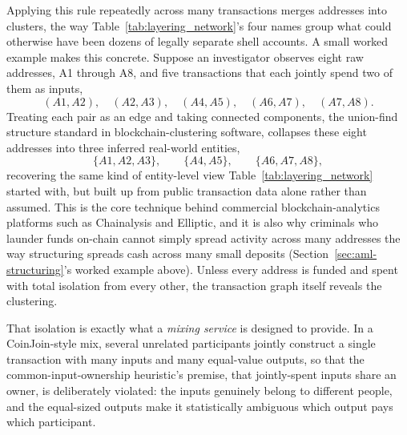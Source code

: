 \documentclass[../ai_in_finance]{subfiles}
\begin{document}
Applying this rule repeatedly across many transactions merges addresses into clusters, the way Table~\ref{tab:layering_network}'s four names group what could otherwise have been dozens of legally separate shell accounts. A small worked example makes this concrete. Suppose an investigator observes eight raw addresses, A1 through A8, and five transactions that each jointly spend two of them as inputs,
\begin{equation*}
(A1, A2), \quad (A2, A3), \quad (A4, A5), \quad (A6, A7), \quad (A7, A8).
\end{equation*}
Treating each pair as an edge and taking connected components, the union-find structure standard in blockchain-clustering software, collapses these eight addresses into three inferred real-world entities,
\begin{equation*}
\{A1, A2, A3\}, \qquad \{A4, A5\}, \qquad \{A6, A7, A8\},
\end{equation*}
recovering the same kind of entity-level view Table~\ref{tab:layering_network} started with, but built up from public transaction data alone rather than assumed. This is the core technique behind commercial blockchain-analytics platforms such as Chainalysis and Elliptic, and it is also why criminals who launder funds on-chain cannot simply spread activity across many addresses the way structuring spreads cash across many small deposits (Section~\ref{sec:aml-structuring}'s worked example above). Unless every address is funded and spent with total isolation from every other, the transaction graph itself reveals the clustering.

That isolation is exactly what a \emph{mixing service} is designed to provide. In a CoinJoin-style mix, several unrelated participants jointly construct a single transaction with many inputs and many equal-value outputs, so that the common-input-ownership heuristic's premise, that jointly-spent inputs share an owner, is deliberately violated: the inputs genuinely belong to different people, and the equal-sized outputs make it statistically ambiguous which output pays which participant.
\end{document}
